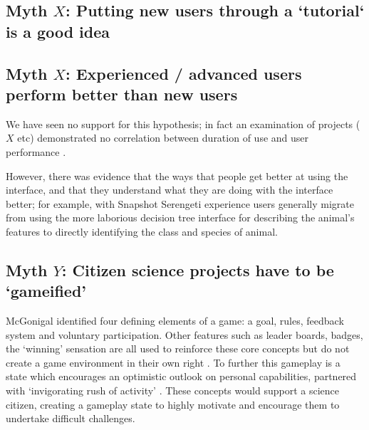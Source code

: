 \documentclass{sigchi}
\begin{document}
\subsection{Myth $X$: Putting new users through a `tutorial` is a good idea}

\subsection{Myth $X$: Experienced / advanced users perform better than new users}
We have seen no support for this hypothesis; in fact an examination of projects ($X$ etc) demonstrated no correlation between duration of use and user performance \cite{simpson2013dynamic}. 

However, there was evidence that the ways that people get better at using the interface, and that they understand what they are doing with the interface better; for example, with Snapshot Serengeti experience users generally migrate from using the more laborious decision tree interface for describing the animal's features to directly identifying the class and species of animal.

\subsection{Myth $Y$: Citizen science projects have to be `gameified'}

McGonigal identified four defining elements of a game: a goal, rules, feedback system and voluntary participation. Other features such as leader boards, badges, the `winning' sensation are all used to reinforce these core concepts but do not create a game environment in their own right \cite{mcgonigal2011reality}. To further this gameplay is a state which encourages an optimistic outlook on personal capabilities, partnered with `invigorating rush of activity' \cite{mcgonigal2011reality}. These concepts would support a science citizen, creating a gameplay state to highly motivate and encourage them to undertake difficult challenges. 

\end{document}
